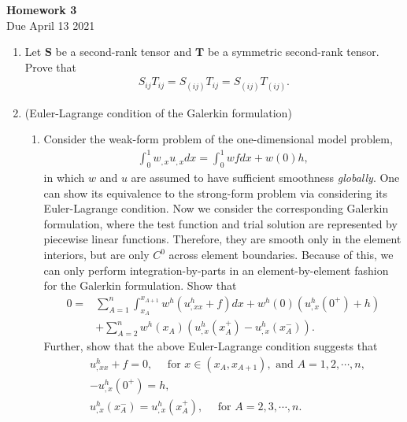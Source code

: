 \documentclass[12pt]{article}
\begin{document}
\begin{center}
\textbf{\Large
Homework 3
}\\
\normalsize Due April 13 2021





\end{center}
\begin{enumerate}
\item Let $\bm S$ be a second-rank tensor and $\bm T$ be a symmetric second-rank tensor. Prove that
\begin{align*}
S_{ij} T_{ij} = S_{(ij)}T_{ij} = S_{(ij)}T_{(ij)}.
\end{align*}

\item (Euler-Lagrange condition of the Galerkin formulation) 
\begin{enumerate}
\item Consider the weak-form problem of the one-dimensional model problem,
\begin{align*}
\int_0^1 w_{,x} u_{,x} dx = \int_0^1 w f dx + w(0)h,
\end{align*}
in which $w$ and $u$ are assumed to have sufficient smoothness \textit{globally}. One can show its equivalence to the strong-form problem via considering its Euler-Lagrange condition. Now we consider the corresponding Galerkin formulation, where the test function and trial solution are represented by piecewise linear functions. Therefore, they are smooth only in the element interiors, but are only $C^0$ across element boundaries. Because of this, we can only perform integration-by-parts in an element-by-element fashion for the Galerkin formulation. Show that
\begin{align*}
0 =& \sum_{A=1}^{n}\int_{x_A}^{x_{A+1}} w^h \left( u^h_{,xx} + f \right)dx + w^h(0)\left( u^h_{,x}(0^+) + h \right) \\
&+ \sum_{A=2}^{n} w^h(x_A)\left( u^h_{,x}(x^{+}_A) - u^h_{,x}(x^{-}_A)\right).
\end{align*}
Further, show that the above Euler-Lagrange condition suggests that
\begin{align*}
& u^h_{,xx} + f = 0, \quad \mbox{ for } x \in (x_A, x_{A+1}), \mbox{ and } A = 1, 2, \cdots, n, \\
& -u^h_{,x}(0^{+}) = h, \\
& u^h_{,x}(x^{-}_A) = u^h_{,x}(x^{+}_A), \quad \mbox{ for } A = 2,3,\cdots, n.
\end{align*}


\end{enumerate}
\end{enumerate}
\end{document}
